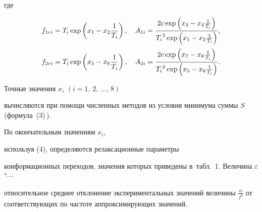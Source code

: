 где 

\begin{equation}

\begin{array}{c}

\displaystyle

f_{1ri} =T_i \exp \left( x_1 -x_2 \frac{1}{T_i } 

\right), 

\quad

A_{1i} =\frac{2c\exp \left( {x_3 -x_4 

\frac{1}{T_i }} \right)}{{T_i }^2\exp \left( {x_1 -x_2 \frac{1}{T_i }} \right)},\vspace{2mm}

\\

\displaystyle

f_{2ri} =T_i \exp \left( {x_5 -x_6 \frac{1}{T_i }} \right),

\quad

A_{2i} =\frac{2c \exp \left( {x_7 -x_8 \frac{1}{T_i }} 

\right)}{ {T_i }^2\exp \left( {x_5 -x_6 

\frac{1}{T_i }} \right)}.

\end{array}

\end{equation}



Точные значения $x_{i}$ $(i=1,\,2,\,\dots,\,8)$ 

вычисляются при помощи численных методов из условия минимума суммы $S$ (формула~(3)\,). 

По окончательным значениям $x_{i}$,

используя (4), определяются релаксационные параметры 

конформационных переходов, значения которых приведены в~табл.~1. Величина $\varepsilon$ "---

относительное среднее отклонение экспериментальных значений величины $\frac\alpha 

{f^2}$ от соответствующих по частоте аппроксимирующих значений.



